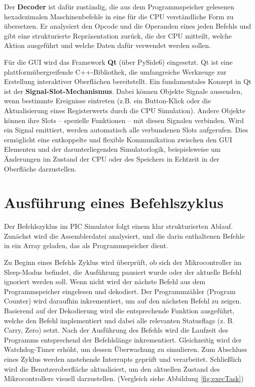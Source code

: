 Der \textbf{Decoder} ist dafür zuständig, die aus dem Programmspeicher gelesenen hexadezimalen Maschinenbefehle in eine für die \ac{CPU} verständliche Form zu übersetzen. Er analysiert den Opcode und die Operanden eines jeden Befehls und gibt eine strukturierte Repräsentation zurück, die der \ac{CPU} mitteilt, welche Aktion ausgeführt und welche Daten dafür verwendet werden sollen.


Für die \ac{GUI} wird das Framework \textbf{Qt} (über PySide6) eingesetzt. Qt ist eine plattformübergreifende C++-Bibliothek, die umfangreiche Werkzeuge zur Erstellung interaktiver Oberflächen bereitstellt. Ein fundamentales Konzept in Qt ist der \textbf{Signal-Slot-Mechanismus}. Dabei können Objekte Signale aussenden, wenn bestimmte Ereignisse eintreten (z.B. ein Button-Klick oder die Aktualisierung eines Registerwerts durch die \ac{CPU} Simulation). Andere Objekte können ihre Slots – spezielle Funktionen – mit diesen Signalen verbinden. Wird ein Signal emittiert, werden automatisch alle verbundenen Slots aufgerufen. Dies ermöglicht eine entkoppelte und flexible Kommunikation zwischen den \ac{GUI} Elementen und der darunterliegenden Simulatorlogik, beispielsweise um Änderungen im Zustand der \ac{CPU} oder des Speichers in Echtzeit in der Oberfläche darzustellen.


\section{Ausführung eines Befehlszyklus}

Der Befehlszyklus im PIC Simulator folgt einem klar strukturierten Ablauf. Zunächst wird die Assemblerdatei analysiert, und die darin enthaltenen Befehle in ein Array geladen, das als Programmspeicher dient. 

Zu Beginn eines Befehls Zyklus wird überprüft, ob sich der Mikrocontroller im Sleep-Modus befindet, die Ausführung pausiert wurde oder der aktuelle Befehl ignoriert werden soll. Wenn nicht wird der nächste Befehl aus dem Programmspeicher eingelesen und dekodiert. Der Programmzähler (Program Counter) wird daraufhin inkrementiert, um auf den nächsten Befehl zu zeigen. Basierend auf der Dekodierung wird die entsprechende Funktion ausgeführt, welche den Befehl implementiert und dabei alle relevanten Statusflags (z. B. Carry, Zero) setzt. Nach der Ausführung des Befehls wird die Laufzeit des Programms entsprechend der Befehlslänge inkrementiert. Gleichzeitig wird der Watchdog-Timer erhöht, um dessen Überwachung zu simulieren. Zum Abschluss eines Zyklus werden anstehende Interrupts geprüft und verarbeitet. Schließlich wird die Benutzeroberfläche aktualisiert, um den aktuellen Zustand des Mikrocontrollers visuell darzustellen. (Vergleich siehe Abbildung \ref{fig:execTask})

